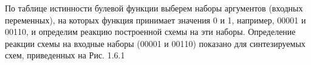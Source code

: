 По таблице истинности булевой функции выберем наборы аргументов (входных переменных), на которых функция принимает значения 0 и 1, например, 00001 и 00110, и определим реакцию построенной схемы на эти наборы. Определение реакции схемы на входные наборы (00001 и 00110) показано для синтезируемых схем, приведенных на Рис. 1.6.1
